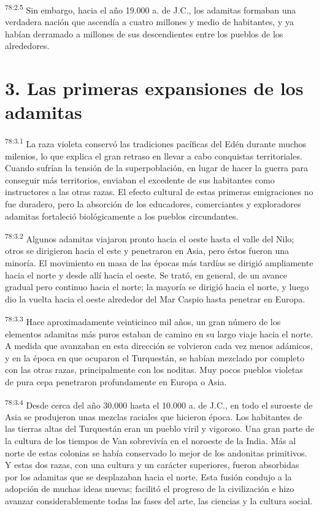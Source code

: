 \par
\textsuperscript{78:2.5} Sin embargo, hacia el año 19.000 a. de J.C., los adamitas formaban una verdadera nación que ascendía a cuatro millones y medio de habitantes, y ya habían derramado a millones de sus descendientes entre los pueblos de los alrededores.

\section*{3. Las primeras expansiones de los adamitas}
\par
\textsuperscript{78:3.1} La raza violeta conservó las tradiciones pacíficas del Edén durante muchos milenios, lo que explica el gran retraso en llevar a cabo conquistas territoriales. Cuando sufrían la tensión de la superpoblación, en lugar de hacer la guerra para conseguir más territorios, enviaban el excedente de sus habitantes como instructores a las otras razas. El efecto cultural de estas primeras emigraciones no fue duradero, pero la absorción de los educadores, comerciantes y exploradores adamitas fortaleció biológicamente a los pueblos circundantes.

\par
\textsuperscript{78:3.2} Algunos adamitas viajaron pronto hacia el oeste hasta el valle del Nilo; otros se dirigieron hacia el este y penetraron en Asia, pero éstos fueron una minoría. El movimiento en masa de las épocas más tardías se dirigió ampliamente hacia el norte y desde allí hacia el oeste. Se trató, en general, de un avance gradual pero continuo hacia el norte; la mayoría se dirigió hacia el norte, y luego dio la vuelta hacia el oeste alrededor del Mar Caspio hasta penetrar en Europa.

\par
\textsuperscript{78:3.3} Hace aproximadamente veinticinco mil años, un gran número de los elementos adamitas más puros estaban de camino en su largo viaje hacia el norte. A medida que avanzaban en esta dirección se volvieron cada vez menos adámicos, y en la época en que ocuparon el Turquestán, se habían mezclado por completo con las otras razas, principalmente con los noditas. Muy pocos pueblos violetas de pura cepa penetraron profundamente en Europa o Asia.

\par
\textsuperscript{78:3.4} Desde cerca del año 30.000 hasta el 10.000 a. de J.C., en todo el suroeste de Asia se produjeron unas mezclas raciales que hicieron época. Los habitantes de las tierras altas del Turquestán eran un pueblo viril y vigoroso. Una gran parte de la cultura de los tiempos de Van sobrevivía en el noroeste de la India. Más al norte de estas colonias se había conservado lo mejor de los andonitas primitivos. Y estas dos razas, con una cultura y un carácter superiores, fueron absorbidas por los adamitas que se desplazaban hacia el norte. Esta fusión condujo a la adopción de muchas ideas nuevas; facilitó el progreso de la civilización e hizo avanzar considerablemente todas las fases del arte, las ciencias y la cultura social.

